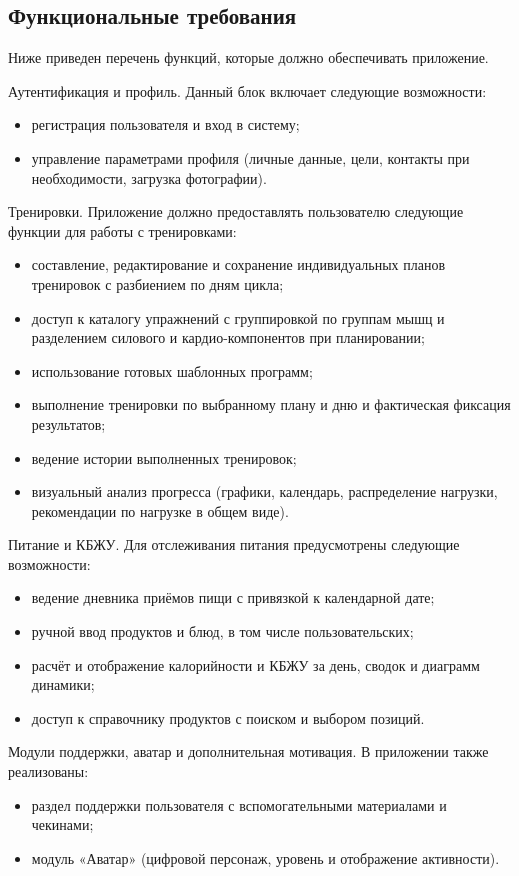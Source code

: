 \subsection{Функциональные требования}

Ниже приведен перечень функций, которые должно обеспечивать приложение.

Аутентификация и профиль. Данный блок включает следующие возможности:
\begin{itemize}
	\item регистрация пользователя и вход в систему;
	\item управление параметрами профиля (личные данные, цели, контакты при необходимости, загрузка фотографии).
\end{itemize}

Тренировки. Приложение должно предоставлять пользователю следующие функции для работы с тренировками:
\begin{itemize}
	\item составление, редактирование и сохранение индивидуальных планов тренировок с разбиением по дням цикла;
	\item доступ к каталогу упражнений с группировкой по группам мышц и разделением силового и кардио-компонентов при планировании;
	\item использование готовых шаблонных программ;
	\item выполнение тренировки по выбранному плану и дню и фактическая фиксация результатов;
	\item ведение истории выполненных тренировок;
	\item визуальный анализ прогресса (графики, календарь, распределение нагрузки, рекомендации по нагрузке в общем виде).
\end{itemize}

Питание и КБЖУ. Для отслеживания питания предусмотрены следующие возможности:
\begin{itemize}
	\item ведение дневника приёмов пищи с привязкой к календарной дате;
	\item ручной ввод продуктов и блюд, в том числе пользовательских;
	\item расчёт и отображение калорийности и КБЖУ за день, сводок и диаграмм динамики;
	\item доступ к справочнику продуктов с поиском и выбором позиций.
\end{itemize}

Модули поддержки, аватар и дополнительная мотивация. В приложении также реализованы:
\begin{itemize}
	\item раздел поддержки пользователя с вспомогательными материалами и чекинами;
	\item модуль «Аватар» (цифровой персонаж, уровень и отображение активности).
\end{itemize}

